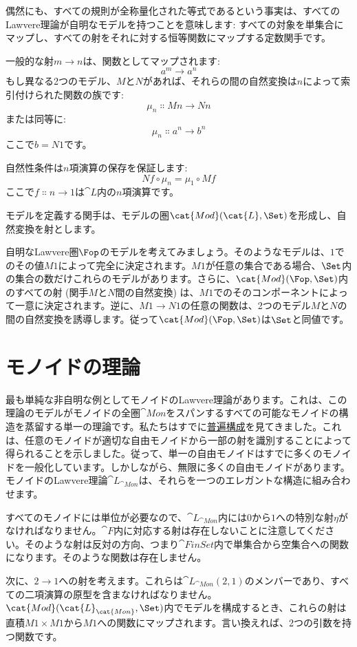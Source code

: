 偶然にも、すべての規則が全称量化された等式であるという事実は、すべてのLawvere理論が自明なモデルを持つことを意味します: すべての対象を単集合にマップし、すべての射をそれに対する恒等関数にマップする定数関手です。

一般的な射$m \to n$は、関数としてマップされます: 
\[a^m \to a^n\]
もし異なる2つのモデル、$M$と$N$があれば、それらの間の自然変換は$n$によって索引付けられた関数の族です: 
\[\mu_n \Colon M n \to N n\]
または同等に: 
\[\mu_n \Colon a^n \to b^n\]
ここで$b = N 1$です。

自然性条件は$n$項演算の保存を保証します: 
\[N f \circ \mu_n = \mu_1 \circ M f\]
ここで$f \Colon n \to 1$は$\cat{L}$内の$n$項演算です。

モデルを定義する関手は、モデルの圏$\cat{Mod}(\cat{L}, \Set)$を形成し、自然変換を射とします。

自明なLawvere圏$\Fop$のモデルを考えてみましょう。そのようなモデルは、$1$でのその値$M 1$によって完全に決定されます。$M 1$が任意の集合である場合、$\Set$内の集合の数だけこれらのモデルがあります。さらに、$\cat{Mod}(\Fop, \Set)$内のすべての射 (関手$M$と$N$間の自然変換) は、$M 1$でのそのコンポーネントによって一意に決定されます。逆に、$M 1 \to N 1$の任意の関数は、2つのモデル$M$と$N$の間の自然変換を誘導します。従って$\cat{Mod}(\Fop, \Set)$は$\Set$と同値です。

\section{モノイドの理論}

最も単純な非自明な例としてモノイドのLawvere理論があります。これは、この理論のモデルがモノイドの全圏$\cat{Mon}$をスパンするすべての可能なモノイドの構造を蒸留する単一の理論です。私たちはすでに\hyperref[free-monoids]{普遍構成}を見てきました。これは、任意のモノイドが適切な自由モノイドから一部の射を識別することによって得られることを示しました。従って、単一の自由モノイドはすでに多くのモノイドを一般化しています。しかしながら、無限に多くの自由モノイドがあります。モノイドのLawvere理論$\cat{L}_{\cat{Mon}}$は、それらを一つのエレガントな構造に組み合わせます。

すべてのモノイドには単位が必要なので、$\cat{L}_{\cat{Mon}}$内には$0$から$1$への特別な射$\eta$がなければなりません。$\cat{F}$内に対応する射は存在しないことに注意してください。そのような射は反対の方向、つまり$\cat{FinSet}$内で単集合から空集合への関数になります。そのような関数は存在しません。

次に、$2 \to 1$への射を考えます。これらは$\cat{L}_{\cat{Mon}}(2, 1)$のメンバーであり、すべての二項演算の原型を含まなければなりません。$\cat{Mod}(\cat{L}_{\cat{Mon}}, \Set)$内でモデルを構成するとき、これらの射は直積$M 1 \times M 1$から$M 1$への関数にマップされます。言い換えれば、2つの引数を持つ関数です。

